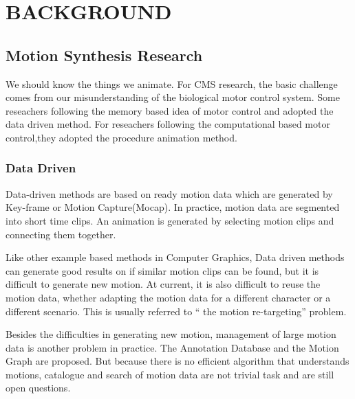 \chapter{BACKGROUND}
\label{chap:background}
\section{Motion Synthesis Research}
We should know the things we animate. 
For CMS research, the basic challenge comes from our misunderstanding of the biological motor control system.
Some reseachers following the memory based idea of motor control and adopted the data driven method.
For reseachers following the computational based motor control,they adopted the procedure animation method.
\subsection{Data Driven}
Data-driven methods are based on ready motion data which are generated by Key-frame or Motion Capture(Mocap). 
In practice, motion data are segmented into short time clips. 
An animation is generated by selecting motion clips and connecting them together\citep{Parent2002}.

Like other example based methods in Computer Graphics, Data driven methods can generate good results on if similar motion clips can be found, but it is difficult to generate new motion.
At current, it is also difficult to reuse the motion data, whether adapting the motion data for a different character or a different scenario. 
This is usually referred to “ the motion re-targeting” problem.

Besides the difficulties in generating new motion, management of large motion data is another problem in practice. 
The Annotation Database \citep{Arikan2003} and the Motion Graph \citep{kovar2008motion}are proposed. 
But because there is no efficient algorithm that understands motions, catalogue and search of motion data are not trivial task and are still open questions.

